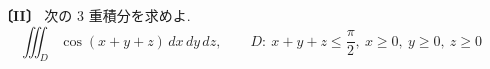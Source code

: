 \noindent\textbf{〔II〕}
次の 3 重積分を求めよ.
\[
\iiint_D \cos(x+y+z)\,dx\,dy\,dz,\qquad
D:\ x+y+z\le \frac{\pi}{2},\ x\ge 0,\ y\ge 0,\ z\ge 0
\]
